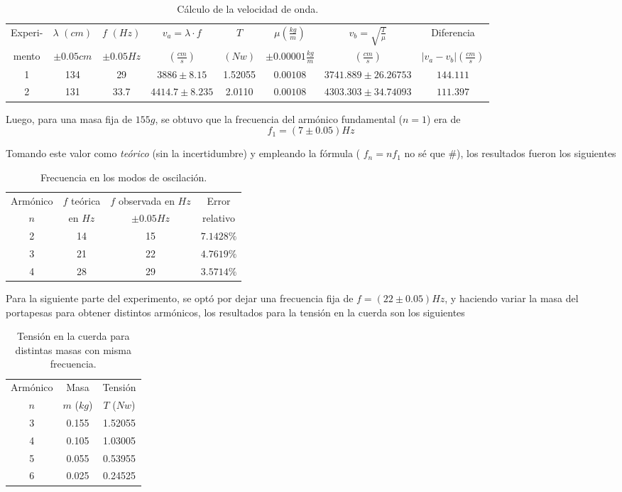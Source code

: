 \documentclass[a4paper, 10pt]{article}
\begin{document}
 	\begin{table}[ht]
 	\footnotesize
 	\centering
 	\caption{Cálculo de la velocidad de onda.}
 		\begin{tabular}{|c|c|c|c|c|c|c|c|}
	 		\hline
	 		Experi-& $ \lambda $ $ (cm)$ & $ f $ $ (Hz)$ & $ v_a=\lambda\cdot f $ & $ T $ & $ \mu  (\frac{kg}{m})$ & $ v_b=\sqrt{\frac{T}{\mu}} $ & Diferencia \\
	 		mento & $ \pm 0.05cm $ & $ \pm 0.05 Hz $ & $ (\frac{cm}{s}) $ & $ (Nw) $ & $ \pm 0.00001\frac{kg}{m} $ & $ (\frac{cm}{s}) $ & $ |v_a-v_b| (\frac{cm}{s}) $ \\
	 		\hline
	 		1 & 134 & 29 & $ 3886\pm8.15 $ & 1.52055 & $0.00108$ & $ 3741.889\pm 26.26753 $ & $ 144.111 $ \\
	 		\hline
	 		2 & 131 & 33.7 & $ 4414.7\pm8.235 $ & 2.0110 & $0.00108$ & $ 4303.303\pm 34.74093 $ & $ 111.397 $ \\
	 		\hline
	 	\end{tabular}
 	\end{table} 
  	
	Luego, para una masa fija de $ 155g $, se obtuvo que la frecuencia del armónico fundamental ($ n=1 $) era de $$f_1=(7\pm0.05)Hz$$
	
	Tomando este valor como \textit{teórico} (sin la incertidumbre) y empleando la fórmula ( $f_n=nf_1$ no sé que \#), los resultados fueron los siguientes
	
	\begin{table}[ht]
		\centering
		\caption{Frecuencia en los modos de oscilación.}
		\begin{tabular}{|c|c|c|c|}
		\hline
		Armónico & $ f $ teórica & $ f $ observada en $Hz$  & Error  \\
		$ n $ & en $ Hz $ & $\pm 0.05 Hz $ & relativo\\
		\hline
		2 & 14 & 15 & $ 7.1428\% $ \\
		\hline
		3 & 21 & 22 & $ 4.7619\% $ \\
		\hline
		4 & 28 & 29 & $ 3.5714\% $ \\
		\hline
		\end{tabular}
	\end{table}
	
	Para la siguiente parte del experimento, se optó por dejar una frecuencia fija de $f=(22\pm 0.05) Hz$, y haciendo variar la masa del portapesas para obtener distintos armónicos, los resultados para la tensión en la cuerda son los siguientes
	
	\begin{table}[ht]
		\centering
		\caption{Tensión en la cuerda para distintas masas con misma frecuencia.}
		\begin{tabular}{|c|c|c|}
			\hline
			Armónico& Masa & Tensión \\
			$ n $& $ m $ ($ kg $) & $ T $ ($ Nw $)  \\
			\hline
			3& 0.155 & 1.52055 \\
			\hline
			4& 0.105 & 1.03005  \\
			\hline
			5& 0.055 & 0.53955  \\
			\hline
			6& 0.025 & 0.24525  \\
			\hline
		\end{tabular}
	\end{table}
 	
\end{document}
